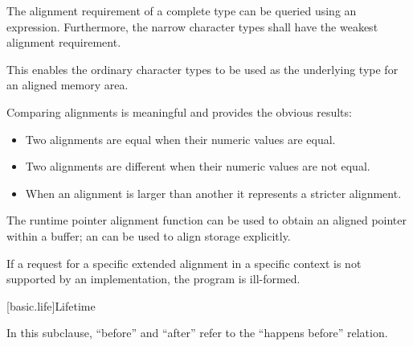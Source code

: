 \pnum
The alignment requirement of a complete type can be queried using an
 expression. Furthermore,
the narrow character types shall have the weakest
alignment requirement.
\begin{note}
This enables the ordinary character types to be used as the
underlying type for an aligned memory area.
\end{note}

\pnum
Comparing alignments is meaningful and provides the obvious results:

\begin{itemize}
\item Two alignments are equal when their numeric values are equal.
\item Two alignments are different when their numeric values are not equal.
\item When an alignment is larger than another it represents a stricter alignment.
\end{itemize}

\pnum
\begin{note}
The runtime pointer alignment function
can be used to obtain an aligned pointer within a buffer;
an 
can be used to align storage explicitly.
\end{note}

\pnum
If a request for a specific extended alignment in a specific context is not
supported by an implementation, the program is ill-formed.

[basic.life]{Lifetime}

\pnum
In this subclause, ``before'' and ``after'' refer to the ``happens before''
relation.

